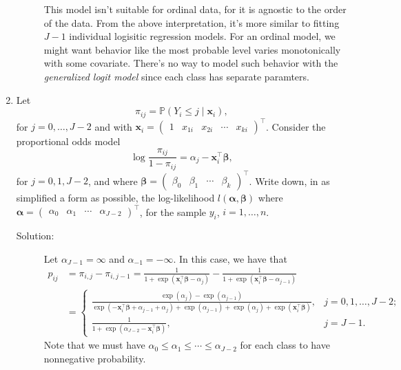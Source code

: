 \documentclass[letterpaper,11pt]{article}
\begin{document}
\begin{enumerate}
\begin{description}
    This model isn't suitable for ordinal data, for it is agnostic to the order
    of the data. From the above interpretation, it's more similar to fitting
    $J - 1$ individual logisitic regression models. For an ordinal model, we
    might want behavior like the most probable level varies monotonically with
    some covariate. There's no way to model such behavior with the
    \emph{generalized logit model} since each class has separate paramters.
  \end{description}
\item Let
  \begin{equation}
    \pi_{ij} = \mathbb{P}\left(Y_i \leq j \mid \mathbf{x}_i\right),
    \label{eqn:p5_pi_ij}
  \end{equation}
  for $j=0,\ldots,J-2$ and with $\mathbf{x}_i = \begin{pmatrix}
    1 & x_{1i} & x_{2i} & \cdots & x_{ki}
  \end{pmatrix}^\intercal$. Consider the proportional odds model
  \begin{equation}
    \log\frac{\pi_{ij}}{1 - \pi_{ij}} = \alpha_j - \mathbf{x}_i^\intercal\bm\beta,
  \end{equation}
  for $j = 0,1,J - 2$, and where $\bm\beta = \begin{pmatrix}
    \beta_0 & \beta_1 & \cdots & \beta_k
  \end{pmatrix}^\intercal$. Write down, in as simplified a form as possible, the
  log-likelihood $l\left(\bm\alpha,\bm\beta\right)$ where
  $\bm\alpha = \begin{pmatrix}
    \alpha_0 & \alpha_1 & \cdots & \alpha_{J - 2}
  \end{pmatrix}^\intercal$, for the sample $y_i$, $i = 1,\ldots,n$.
  \begin{description}
  \item[Solution:] Let $\alpha_{J-1} = \infty$ and
    $\alpha_{-1} = -\infty$. In this case, we have that
    \begin{align}
      p_{ij}
      &= \pi_{i,j} - \pi_{i,j-1} 
        =  \frac{1}{1 + \exp\left(\mathbf{x}_i^\intercal\bm\beta - \alpha_j\right)} -
        \frac{1}{1 + \exp\left(\mathbf{x}_i^\intercal\bm\beta - \alpha_{j-1}\right)}
      \label{eqn:p5_pij}\\
      &= \begin{cases}
        \frac{
          \exp\left(\alpha_{j}\right) - \exp\left(\alpha_{j - 1}\right)
        }{
          \exp\left(-\mathbf{x}_i^\intercal\bm\beta + \alpha_{j-1} + \alpha_j\right) +
          \exp\left(\alpha_{j-1}\right) + \exp\left(\alpha_{j}\right) +
          \exp\left(\mathbf{x}_i^\intercal\bm\beta\right)
        }, &j=0,1,\ldots,J-2; \\
        \frac{1}{1 + \exp\left(\alpha_{J-2} - \mathbf{x}_i^\intercal\bm\beta\right)}, &j=J-1.
    \end{cases}\nonumber
    \end{align}
    Note that we must have
    $\alpha_0 \leq \alpha_1 \leq \cdots \leq \alpha_{J-2}$ for each class to
    have nonnegative probability.


\end{description}
\end{enumerate}
\end{document}
